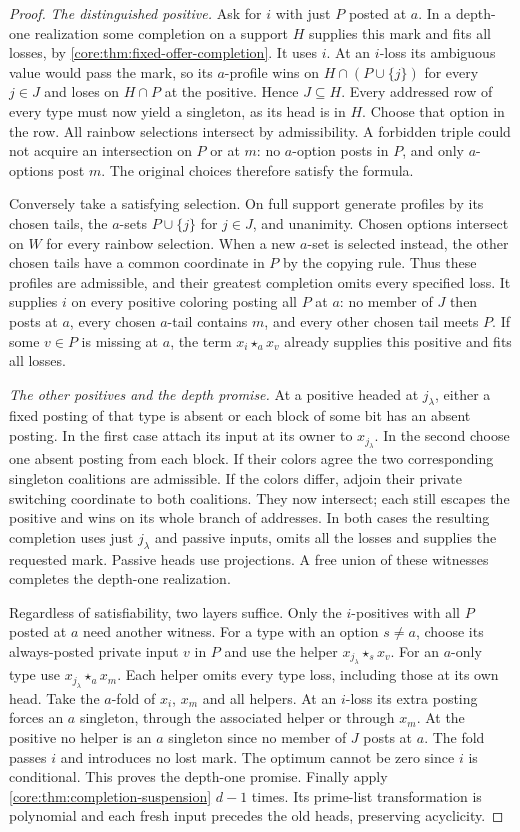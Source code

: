 \begin{proof}
\emph{The distinguished positive.}
Ask for $i$ with just $P$ posted at $a$. In a depth-one realization
some completion on a support $H$ supplies this mark and fits all losses,
by \cref{core:thm:fixed-offer-completion}. It uses $i$. At an $i$-loss
its ambiguous value would pass the mark, so its $a$-profile wins on
$H\cap(P\cup\{j\})$ for every $j\in J$ and loses on $H\cap P$ at
the positive. Hence $J\subseteq H$. Every addressed row of every type
must now yield a singleton, as its head is in $H$. Choose that option
in the row. All rainbow selections intersect by admissibility. A
forbidden triple could not acquire an intersection on $P$ or at $m$:
no $a$-option posts in $P$, and only $a$-options post $m$. The original
choices therefore satisfy the formula.

Conversely take a satisfying selection. On full support generate
profiles by its chosen tails, the $a$-sets $P\cup\{j\}$ for $j\in J$,
and unanimity. Chosen options intersect on $W$ for every rainbow
selection. When a new $a$-set is selected instead, the other chosen
tails have a common coordinate in $P$ by the copying rule. Thus these
profiles are admissible, and their greatest completion omits every
specified loss. It supplies $i$ on every positive coloring posting all
$P$ at $a$: no member of $J$ then posts at $a$, every chosen
$a$-tail contains $m$, and every other chosen tail meets $P$.
If some $v\in P$ is missing at $a$, the term $x_i\star_a x_v$
already supplies this positive and fits all losses.

\emph{The other positives and the depth promise.}
At a positive headed at $j_\lambda$, either a fixed posting of that
type is absent or each block of some bit has an absent posting. In
the first case attach its input at its owner to $x_{j_\lambda}$.
In the second choose one absent posting from each block. If their
colors agree the two corresponding singleton coalitions are admissible.
If the colors differ, adjoin their private switching coordinate to
both coalitions. They now intersect; each still escapes the positive
and wins on its whole branch of addresses. In both cases the resulting
completion uses just $j_\lambda$ and passive inputs, omits all the
losses and supplies the requested mark. Passive heads use projections.
A free union of these witnesses completes the depth-one realization.

Regardless of satisfiability, two layers suffice. Only the $i$-positives
with all $P$ posted at $a$ need another witness. For a type with an
option $s\ne a$, choose its always-posted private input $v$ in $P$ and
use the helper $x_{j_\lambda}\star_s x_v$. For an $a$-only type use
$x_{j_\lambda}\star_a x_m$. Each helper omits every type loss, including
those at its own head. Take the $a$-fold of $x_i$, $x_m$ and all helpers.
At an $i$-loss its extra posting forces an $a$ singleton, through the
associated helper or through $x_m$. At the positive no helper is an
$a$ singleton since no member of $J$ posts at $a$. The fold passes
$i$ and introduces no lost mark. The optimum cannot be zero since $i$
is conditional. This proves the depth-one promise. Finally apply
\cref{core:thm:completion-suspension} $d-1$ times. Its prime-list
transformation is polynomial and each fresh input precedes the old
heads, preserving acyclicity.
\end{proof}
